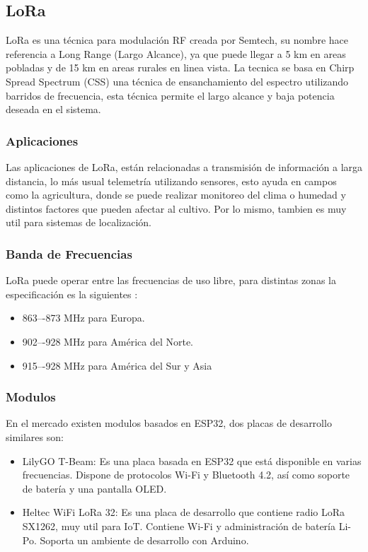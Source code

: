 \documentclass[journal]{IEEEtran}
\begin{document}
\subsection{LoRa}

LoRa es una técnica para modulación RF creada por Semtech, su nombre hace referencia a Long Range (Largo Alcance), ya que puede llegar a 5 km en areas pobladas y de 15 km en areas rurales en linea vista. La tecnica se basa en Chirp Spread Spectrum (CSS) una técnica de ensanchamiento del espectro utilizando barridos de frecuencia, esta técnica permite el largo alcance y baja potencia deseada en el sistema. \cite{semtech_lora_and_lorawan}

\subsubsection{Aplicaciones}

Las aplicaciones de LoRa, están relacionadas a transmisión de información a larga distancia, lo más usual telemetría utilizando sensores, esto ayuda en campos como la agricultura, donde se puede realizar monitoreo del clima o humedad y distintos factores que pueden afectar al cultivo. Por lo mismo, tambien es muy util para sistemas de localización.

\subsubsection{Banda de Frecuencias}

LoRa puede operar entre las frecuencias de uso libre, para distintas zonas la especificación es la siguientes \cite{lora_rp002-1.0.3_2021}:

\begin{itemize}
    \item 863–-873 MHz para Europa.
    \item 902–-928 MHz para América del Norte.
    \item 915–-928 MHz para América del Sur y Asia
\end{itemize}

\subsubsection{Modulos}

En el mercado existen modulos basados en ESP32, dos placas de desarrollo similares son:

\begin{itemize}
    \item LilyGO T-Beam: Es una placa basada en ESP32 que está disponible en varias frecuencias. Dispone de protocolos Wi-Fi y Bluetooth 4.2, así como soporte de batería y una pantalla OLED. \cite{lilygo_tbeam_nodate}

    \item Heltec WiFi LoRa 32: Es una placa de desarrollo que contiene radio LoRa SX1262, muy util para IoT. Contiene Wi-Fi y administración de batería Li-Po. Soporta un ambiente de desarrollo con Arduino. \cite{heltec_wifilora32_v3_nodate}
\end{itemize}
\end{document}
